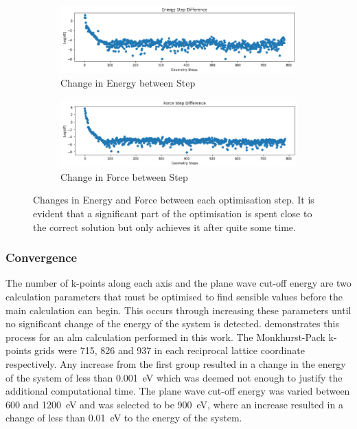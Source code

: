 \begin{figure}
\begin{subfigure}{1\textwidth}
    \centering
    \includegraphics[scale=0.5]{Figures/Analysis/IVDW/D2_Energy_Force_Step1.png}
    \caption{Change in Energy between Step}
    \label{fig:energy_step}
    \vspace{10 mm}
\end{subfigure}
\vspace{10 mm}
\begin{subfigure}{1\textwidth}
    \centering
    \includegraphics[scale=0.5]{Figures/Analysis/IVDW/D2_Energy_Force_Step2.png}
    \caption{Change in Force between Step}
    \label{fig:force_step}
\end{subfigure}
\captionsetup{font = footnotesize, justification = centering}
\caption[Changes in Energy and Force Between each Optimisation Step]{Changes in Energy and Force between each optimisation step. It is evident that a significant part of the optimisation is spent close to the correct solution but only achieves it after quite some time.}
\label{fig:energy_force_step}
\end{figure}

\subsubsection{Convergence}
\label{subsubsec:convergence}
The number of k\nobreakdash-points along each axis and the plane wave cut\nobreakdash-off energy are two calculation parameters that must be optimised to find sensible values before the main calculation can begin. This occurs through increasing these parameters until no significant change of the energy of the system is detected.  demonstrates this process for an \acrshort{alm} calculation performed in this work. The Monkhurst\nobreakdash-Pack k\nobreakdash-points grids were 715, 826 and 937 in each reciprocal lattice coordinate respectively. Any increase from the first group resulted in a change in the energy of the system of less than \SI{0.001}{eV} which was deemed not enough to justify the additional computational time. The plane wave cut\nobreakdash-off energy was varied between 600 and \SI{1200}{eV} and was selected to be \SI{900}{eV}, where an increase resulted in a change of less than \SI{0.01}{eV} to the energy of the system. 

